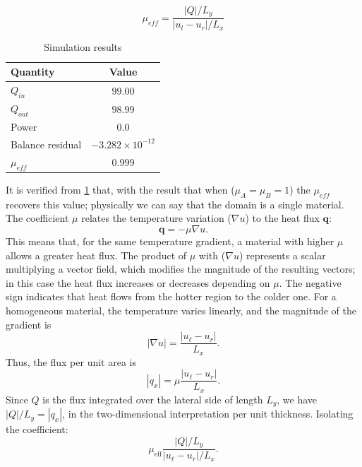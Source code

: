\documentclass{article}
\begin{document}
	\begin{equation}
		\mu_{eff} = \frac{|Q| / L_{y}}{|u_{l} - u_{r}|/L_{x}}
	\end{equation}
	
	\begin{table}[htbp]
		\centering
		\caption{Simulation results}
		\label{tab:resultados_nonhomogen}
		\begin{tabular}{lc}
			\hline
			\textbf{Quantity} & \textbf{Value} \\
			\hline
			$Q_{in}$ & $99.00$ \\
			$Q_{out}$ & $98.99$ \\
			Power & $0.0$ \\
			Balance residual & $-3.282 \times 10^{-12}$ \\
			$\mu_{eff}$ & $0.999$ \\
			\hline
		\end{tabular}
	\end{table}
	It is verified from \cref{tab:resultados_nonhomogen} that, with the result that when ($\mu_{A} = \mu_{B} = 1$) the \(\mu_{eff}\) recovers this value; physically we can say that the domain is a single material.
	The coefficient \(\mu\) relates the temperature variation ($\nabla u$) to the heat flux $\mathbf q$:
	\begin{equation*}
		\mathbf q=-\mu\nabla u.
	\end{equation*}
	This means that, for the same temperature gradient, a material with higher \(\mu\) allows a greater heat flux. The product of $\mu$ with ($\nabla u$) represents a scalar multiplying a vector field, which modifies the magnitude of the resulting vectors; in this case the heat flux increases or decreases depending on $\mu$. The negative sign indicates that heat flows from the hotter region to the colder one.
	For a homogeneous material, the temperature varies linearly, and the magnitude of the gradient is
	\begin{equation*}
		|\nabla u|=\frac{|u_\ell-u_r|}{L_x}.
	\end{equation*}
	Thus, the flux per unit area is
	\begin{equation*}
		|q_x|=\mu\frac{|u_\ell-u_r|}{L_x}.
	\end{equation*}
	Since \(Q\) is the flux integrated over the lateral side of length \(L_y\), we have \(|Q|/L_y=|q_x|\), in the two-dimensional interpretation per unit thickness. Isolating the coefficient:
	\begin{equation*}
		\mu_{\mathrm{eff}}
		\frac{|Q|/L_y}{|u_\ell-u_r|/L_x}.
	\end{equation*}
	
\end{document}
